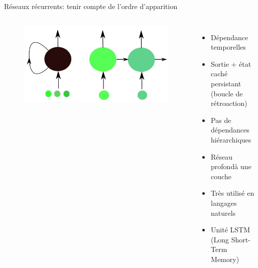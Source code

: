 \documentclass{beamer}
\begin{document}
\begin{frame}{Réseaux récurrents: tenir compte de l'ordre d'apparition}
  \begin{columns}
    \begin{figure}
      \centering
      \includegraphics[scale=0.15]{../Figures/Recurrent}
    \end{figure}

    \begin{itemize}
    \item Dépendance temporelles\pause
    \item Sortie + état caché persistant (boucle de rétroaction)\pause
    \item Pas de dépendances hiérarchiques\pause
    \item Réseau \og profond\fg à une couche \pause
    \item Très utilisé en langages naturels\pause
    \item Unité LSTM (Long Short-Term Memory)
    \end{itemize}
  \end{columns}
\end{frame}
\end{document}
